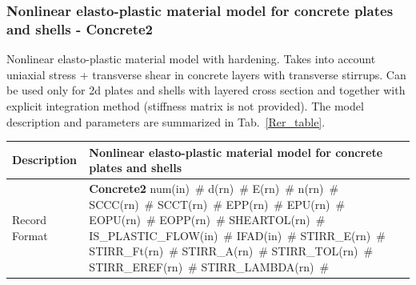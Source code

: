 \documentclass[a4paper]{article}
\newcommand{\descitem}[1]{{\noindent \bf #1}}
\newcommand{\elemparam}[2]{{{#1\tiny (#2)}~\#}}
\newenvironment{mmt}{\begin{tabular}{|l|p{9cm}|}}{\end{tabular}\\}
\newenvironment{mmt}{\begin{tabular}{|l|l|}}{\end{tabular}\\}
\begin{document}
\subsubsection{Nonlinear elasto-plastic material model for concrete
plates and shells - Concrete2}
\label{Rer}
Nonlinear elasto-plastic material model with hardening.
Takes into account uniaxial stress + transverse shear in concrete
layers with transverse stirrups.
Can be used only for 2d plates and shells with layered cross section
and together with explicit integration method (stiffness matrix is not
provided).
The model description and parameters are summarized
in Tab.~\ref{Rer_table}.

\begin{table}[!htb]
\begin{mmt}
\hline
Description & Nonlinear elasto-plastic material model for concrete
plates and shells\\
\hline
Record Format & \descitem{Concrete2} \elemparam{num}{in}
\elemparam{d}{rn} \elemparam{E}{rn} \elemparam{n}{rn}
\elemparam{SCCC}{rn} \elemparam{SCCT}{rn} \elemparam{EPP}{rn} \elemparam{EPU}{rn}
\elemparam{EOPU}{rn} \elemparam{EOPP}{rn} \elemparam{SHEARTOL}{rn}
\elemparam{IS\_PLASTIC\_FLOW}{in} \elemparam{IFAD}{in} \elemparam{STIRR\_E}{rn} \elemparam{STIRR\_Ft}{rn}
\elemparam{STIRR\_A}{rn} \elemparam{STIRR\_TOL}{rn} \elemparam{STIRR\_EREF}{rn}
\elemparam{STIRR\_LAMBDA}{rn}\\


\end{mmt}
\end{table}
\end{document}
